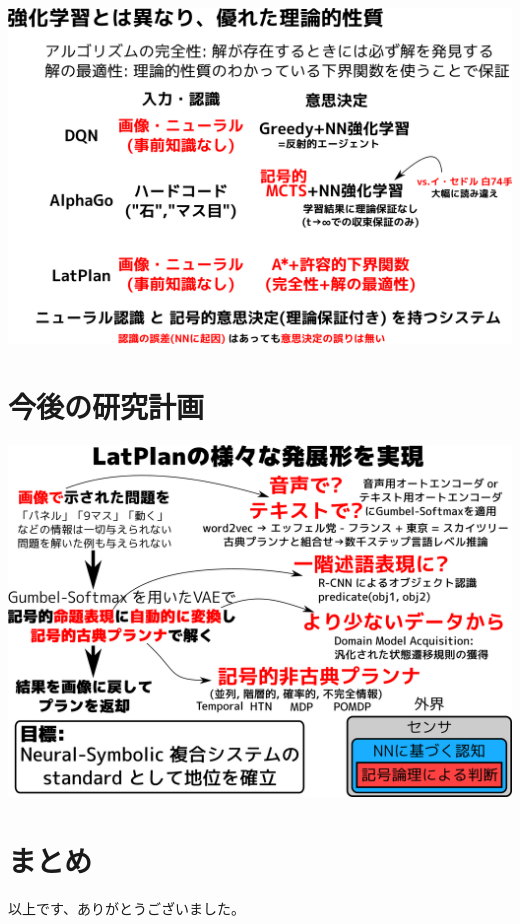 \includegraphics{img/keps17-3.png}

\section{今後の研究計画}
\label{sec-10}

\begin{resume}

\end{resume}

\includegraphics{img/keps17-4.png}

\section{まとめ}
\label{sec-11}

\begin{resume}
以上です、ありがとうございました。
\end{resume}


